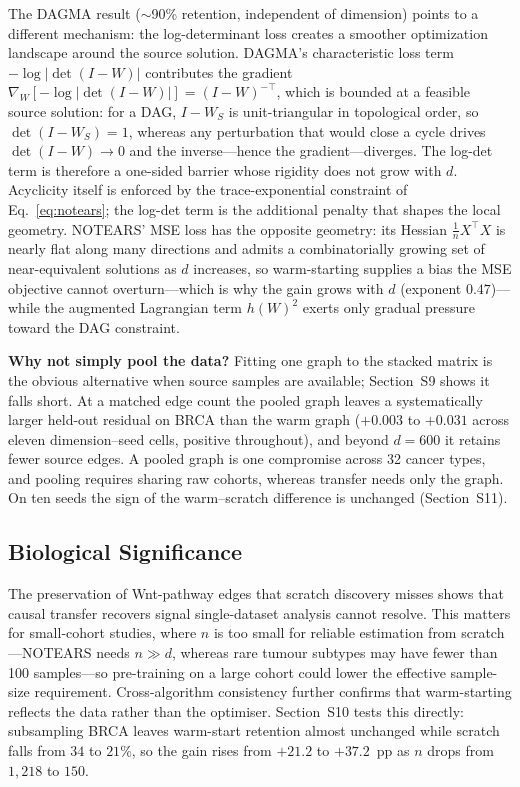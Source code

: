 \documentclass{ws-jbcb}
\begin{document}
The DAGMA result ($\sim$90\% retention, independent of dimension) points to a different mechanism: the log-determinant loss creates a smoother optimization landscape around the source solution. DAGMA's characteristic loss term $-\log|\det(I-W)|$ contributes the gradient
$\nabla_W[-\log|\det(I-W)|] = (I-W)^{-\top}$, which is bounded at a feasible source solution: for a DAG, $I-W_S$ is unit-triangular in topological order, so $\det(I-W_S)=1$, whereas any perturbation that would close a cycle drives $\det(I-W)\to 0$ and the inverse---hence the gradient---diverges. The log-det term is therefore a one-sided barrier whose rigidity does not grow with $d$. Acyclicity itself is enforced by the trace-exponential constraint of Eq.~\eqref{eq:notears}; the log-det term is the additional penalty that shapes the local geometry. NOTEARS' MSE loss has the opposite geometry: its Hessian $\tfrac{1}{n}X^\top X$ is nearly flat along many directions and admits a combinatorially growing set of near-equivalent solutions as $d$ increases, so warm-starting supplies a bias the MSE objective cannot overturn---which is why the gain grows with $d$ (exponent $0.47$)---while the augmented Lagrangian term $h(W)^2$ exerts only gradual pressure toward the DAG constraint.

\smallskip\noindent\textbf{Why not simply pool the data?} Fitting one graph to the stacked matrix is the obvious alternative when source samples are available; Section~S9 shows it falls short. At a matched edge count the pooled graph leaves a systematically larger held-out residual on BRCA than the warm graph ($+0.003$ to $+0.031$ across eleven dimension--seed cells, positive throughout), and beyond $d=600$ it retains fewer source edges. A pooled graph is one compromise across 32 cancer types, and pooling requires sharing raw cohorts, whereas transfer needs only the graph. On ten seeds the sign of the warm--scratch difference is unchanged (Section~S11).

\subsection{Biological Significance}

The preservation of Wnt-pathway edges that scratch discovery misses shows that causal transfer recovers signal single-dataset analysis cannot resolve. This matters for small-cohort studies, where $n$ is too small for reliable estimation from scratch---NOTEARS needs $n \gg d$, whereas rare tumour subtypes may have fewer than 100 samples---so pre-training on a large cohort could lower the effective sample-size requirement. Cross-algorithm consistency further confirms that warm-starting reflects the data rather than the optimiser. Section~S10 tests this directly: subsampling BRCA leaves warm-start retention almost unchanged while scratch falls from $34$ to $21\%$, so the gain rises from $+21.2$ to $+37.2$~pp as $n$ drops from $1{,}218$ to $150$.
\end{document}
